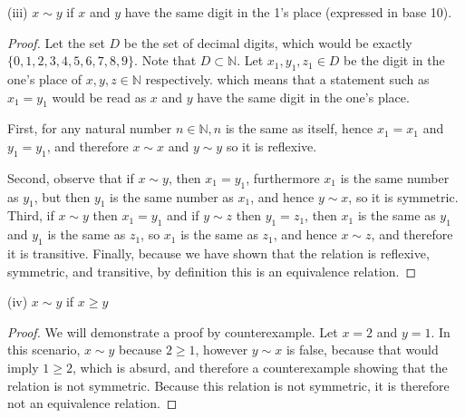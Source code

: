 \documentclass[a4paper]{article}
\begin{document}
\begin{myparindent}{0pt}
(iii) $x \sim y$ if $x$ and $y$ have the same digit in the 1's place (expressed in base 10). \newline
\begin{proof}
Let the set $D$ be the set of decimal digits, which would be exactly $\{0, 1, 2, 3, 4, 5, 6, 7, 8, 9\}$.
Note that $D \subset \mathbb{N}$.
Let $x_1, y_1, z_1 \in D$ be the digit in the one's place of $x, y, z \in \mathbb{N}$ respectively.
which means that a statement such as $x_1 = y_1$ would be read as $x$ and $y$ have the
same digit in the one's place.\newline
\newline

First, for any natural number $n \in \mathbb{N}, n$ is the same as itself,
hence $x_1 = x_1$ and $y_1 = y_1$, and therefore $x \sim x$ and $y \sim y$ so it is reflexive. \newline
\newline

Second, observe that if $x \sim y$, then $x_1 = y_1$, furthermore $x_1$ is the same number as $y_1$, but then $y_1$ is the same number as $x_1$,
and hence $y \sim x$, so it is symmetric. \newline
\newline
Third, if $x \sim y$ then $x_1 = y_1$ and if $y \sim z$ then $y_1 = z_1$, then $x_1$ is the same as $y_1$ and $y_1$ is the same as $z_1$,
so $x_1$ is the same as $z_1$, and hence $x \sim z$, and therefore it is transitive. \newline
\newline
Finally, because we have shown that the relation is reflexive, symmetric, and transitive, by definition
this is an equivalence relation.
\end{proof}


(iv) $x \sim y$ if $x \ge y$ \newline
\begin{proof}
We will demonstrate a proof by counterexample. Let $x = 2$ and $y = 1$. In this scenario, $x \sim y$ because
$2 \ge 1$, however $y \sim x$ is false, because that would imply $1 \ge 2$, which is absurd,
and therefore a counterexample showing that the relation is not symmetric.
Because this relation is not symmetric, it is therefore not an equivalence relation.
\end{proof}

\end{myparindent}
\end{document}
